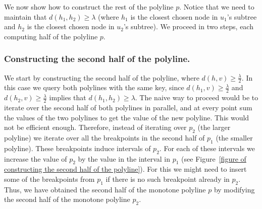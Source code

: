 \documentclass[a4paper,UKenglish]{lipics-v2016}
\theoremstyle{plain}
\begin{document}
We now show how to construct the rest of the polyline $p$. Notice that we need to maintain that $d(h_1,h_2) \geq \lambda$ (where $h_1$ is the closest chosen node in $u_1$'s subtree and $h_2$ is the closest chosen node in $u_2$'s subtree). We proceed in two steps, each computing half of the polyline $p$.

\subsubsection{Constructing the second half of the polyline.} We start by constructing the second half of the polyline, where $d(h,v) \geq \frac{\lambda}{2}$. In this case we query both polylines with the same key, since $d(h_1,v) \geq \frac{\lambda}{2}$ and $d(h_2,v) \geq \frac{\lambda}{2}$ implies that $d(h_1,h_2) \geq \lambda$. The naive way to proceed would be to iterate over the second half of both polylines in parallel, and at every point sum the values of the two polylines to get the value of the new polyline. This would not be efficient enough. Therefore, instead of iterating over $p_2$ (the larger polyline) we iterate over all the breakpoints in the second half of $p_1$ (the smaller polyline). These breakpoints induce intervals of $p_2$. For each of these intervals we increase the value of $p_{2}$ by the value in the interval in $p_1$ (see Figure~\ref{figure of constructing the second half of the polyline}). For this we might need to insert some of the breakpoints from $p_1$ if there is no such breakpoint already in $p_2$. Thus, we have obtained the second half of the monotone polyline $p$ by modifying the second half of the monotone polyline $p_{2}$.
\end{document}
